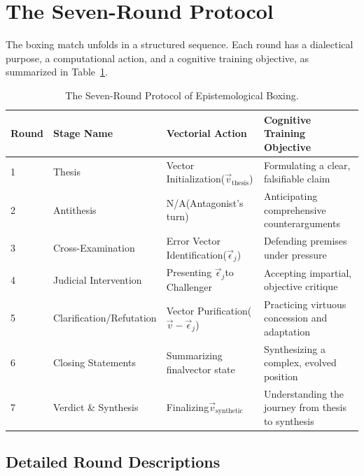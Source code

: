 \documentclass[11pt,a4paper]{article}
\begin{document}
\section{The Seven-Round Protocol}

The boxing match unfolds in a structured sequence. Each round has a dialectical purpose, a computational action, and a cognitive training objective, as summarized in Table~\ref{tab:protocol_summary}.

\begin{table}[htbp]
\centering
\caption{The Seven-Round Protocol of Epistemological Boxing.}
\label{tab:protocol_summary}
\small
\begin{tabular}{@{}p{0.8cm}p{3.2cm}p{4.5cm}p{5cm}@{}}
\toprule
\textbf{Round} & \textbf{Stage Name} & \textbf{Vectorial Action} & \textbf{Cognitive Training Objective} \\ 
\midrule
1 & Thesis & Vector Initialization\newline($\vec{v}_{\text{thesis}}$) & Formulating a clear, falsifiable claim \\[0.4em]
2 & Antithesis & N/A\newline(Antagonist's turn) & Anticipating comprehensive counterarguments \\[0.4em]
3 & Cross-Examination & Error Vector Identification\newline($\vec{\epsilon}_j$) & Defending premises under pressure \\[0.4em]
4 & Judicial Intervention & Presenting $\vec{\epsilon}_j$\newline to Challenger & Accepting impartial, objective critique \\[0.4em]
5 & Clarification/\newline Refutation & Vector Purification\newline($\vec{v} - \vec{\epsilon}_j$) & Practicing virtuous concession and adaptation \\[0.4em]
6 & Closing Statements & Summarizing final\newline vector state & Synthesizing a complex, evolved position \\[0.4em]
7 & Verdict \& Synthesis & Finalizing\newline $\vec{v}_{\text{synthetic}}$ & Understanding the journey from thesis to synthesis \\ 
\bottomrule
\end{tabular}
\end{table}

\subsection{Detailed Round Descriptions}
\end{document}
